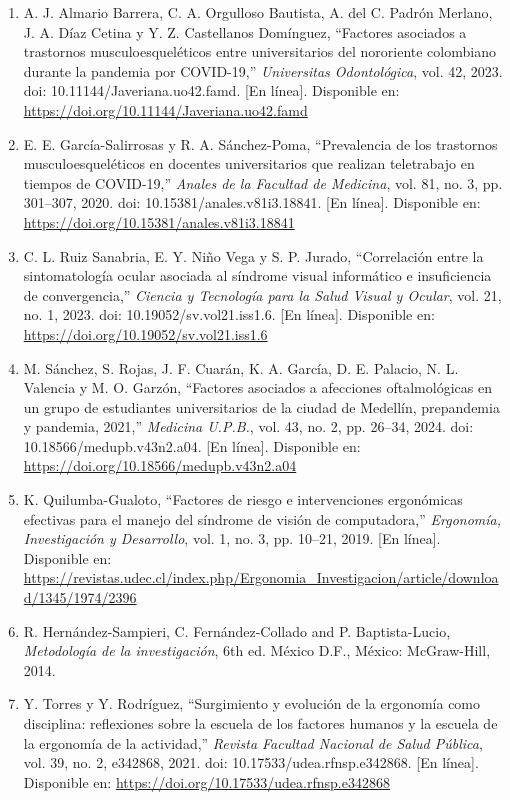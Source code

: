 \begin{enumerate}[leftmargin=1.8em,label=\lbrack\arabic*\rbrack,itemsep=0.6em]
\item A. J. Almario Barrera, C. A. Orgulloso Bautista, A. del C. Padrón Merlano, J. A. Díaz Cetina y Y. Z. Castellanos Domínguez, ``Factores asociados a trastornos musculoesqueléticos entre universitarios del nororiente colombiano durante la pandemia por COVID-19,'' \emph{Universitas Odontológica}, vol. 42, 2023. doi: 10.11144/Javeriana.uo42.famd. [En línea]. Disponible en: \url{https://doi.org/10.11144/Javeriana.uo42.famd}

\item E. E. García-Salirrosas y R. A. Sánchez-Poma, ``Prevalencia de los trastornos musculoesqueléticos en docentes universitarios que realizan teletrabajo en tiempos de COVID-19,'' \emph{Anales de la Facultad de Medicina}, vol. 81, no. 3, pp. 301--307, 2020. doi: 10.15381/anales.v81i3.18841. [En línea]. Disponible en: \url{https://doi.org/10.15381/anales.v81i3.18841}

\item C. L. Ruiz Sanabria, E. Y. Niño Vega y S. P. Jurado, ``Correlación entre la sintomatología ocular asociada al síndrome visual informático e insuficiencia de convergencia,'' \emph{Ciencia y Tecnología para la Salud Visual y Ocular}, vol. 21, no. 1, 2023. doi: 10.19052/sv.vol21.iss1.6. [En línea]. Disponible en: \url{https://doi.org/10.19052/sv.vol21.iss1.6}

\item M. Sánchez, S. Rojas, J. F. Cuarán, K. A. García, D. E. Palacio, N. L. Valencia y M. O. Garzón, ``Factores asociados a afecciones oftalmológicas en un grupo de estudiantes universitarios de la ciudad de Medellín, prepandemia y pandemia, 2021,'' \emph{Medicina U.P.B.}, vol. 43, no. 2, pp. 26--34, 2024. doi: 10.18566/medupb.v43n2.a04. [En línea]. Disponible en: \url{https://doi.org/10.18566/medupb.v43n2.a04}

\item K. Quilumba-Gualoto, ``Factores de riesgo e intervenciones ergonómicas efectivas para el manejo del síndrome de visión de computadora,'' \emph{Ergonomía, Investigación y Desarrollo}, vol. 1, no. 3, pp. 10--21, 2019. [En línea]. Disponible en: \url{https://revistas.udec.cl/index.php/Ergonomia_Investigacion/article/download/1345/1974/2396}

\item R. Hernández-Sampieri, C. Fernández-Collado and P. Baptista-Lucio,
\textit{Metodología de la investigación}, 6th ed.
México D.F., México: McGraw-Hill, 2014.

\item Y. Torres y Y. Rodríguez, ``Surgimiento y evolución de la ergonomía como disciplina: reflexiones sobre la escuela de los factores humanos y la escuela de la ergonomía de la actividad,'' \emph{Revista Facultad Nacional de Salud Pública}, vol. 39, no. 2, e342868, 2021. doi: 10.17533/udea.rfnsp.e342868. [En línea]. Disponible en: \url{https://doi.org/10.17533/udea.rfnsp.e342868}


\end{enumerate}
